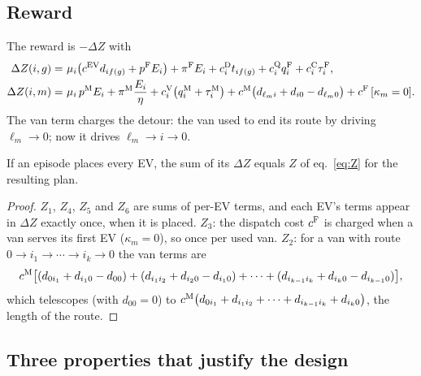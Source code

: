 \subsection{Reward}
\label{sec:reward}

The reward is $-\Delta Z$ with
\begin{align*}
\Delta Z(i,g)=&\ \mu_i\big(c^{\mathrm{EV}}d_{if(g)}+p^{\mathrm{F}} E_i\big)+\pi^{\mathrm{F}} E_i+c^{\mathrm D}_i t_{if(g)}+c^{\mathrm Q}_i q^{\mathrm{F}}_i+c^{\mathrm C}_i\tau^{\mathrm{F}}_i,\\
\Delta Z(i,m)=&\ \mu_i\,p^{\mathrm{M}} E_i+\pi^{\mathrm{M}}\frac{E_i}{\eta}+c^{\mathrm V}_i\big(q^{\mathrm{M}}_i+\tau^{\mathrm{M}}_i\big)+c^{\mathrm{M}}\big(d_{\ell_m i}+d_{i0}-d_{\ell_m 0}\big)+c^{\mathrm{F}}\,[\kappa_m=0].
\end{align*}
The van term charges the detour: the van used to end its route by driving $\ell_m\to0$; now it drives $\ell_m\to i\to0$.

\begin{proposition}\label{prop:reward}
If an episode places every EV, the sum of its $\Delta Z$ equals $Z$ of eq.~\eqref{eq:Z} for the resulting plan.
\end{proposition}
\begin{proof}
$Z_1$, $Z_4$, $Z_5$ and $Z_6$ are sums of per-EV terms, and each EV's terms appear in $\Delta Z$ exactly once, when it is placed. $Z_3$: the dispatch cost $c^{\mathrm{F}}$ is charged when a van serves its first EV ($\kappa_m=0$), so once per used van. $Z_2$: for a van with route $0\to i_1\to\cdots\to i_k\to0$ the van terms are
\[
c^{\mathrm{M}}\big[(d_{0i_1}+d_{i_10}-d_{00})+(d_{i_1i_2}+d_{i_20}-d_{i_10})+\dots+(d_{i_{k-1}i_k}+d_{i_k0}-d_{i_{k-1}0})\big],
\]
which telescopes (with $d_{00}=0$) to $c^{\mathrm{M}}\big(d_{0i_1}+d_{i_1i_2}+\dots+d_{i_{k-1}i_k}+d_{i_k0}\big)$, the length of the route.
\end{proof}

\subsection{Three properties that justify the design}

